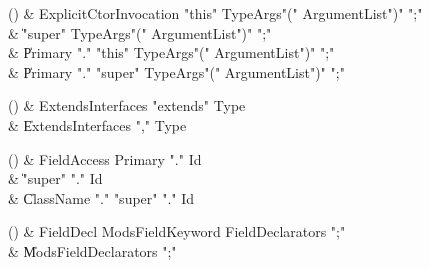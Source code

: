 \begin{bbgrammarappendix}

() & ExplicitCtorInvocation \label{prod:ExplicitCtorInvocation}  \: \xcd"this" TypeArgs\opt \xcd"(" ArgumentList\opt \xcd")" \xcd";"  \\

 &    \| \xcd"super" TypeArgs\opt \xcd"(" ArgumentList\opt \xcd")" \xcd";" \\
 &    \| Primary \xcd"." \xcd"this" TypeArgs\opt \xcd"(" ArgumentList\opt \xcd")" \xcd";" \\
 &    \| Primary \xcd"." \xcd"super" TypeArgs\opt \xcd"(" ArgumentList\opt \xcd")" \xcd";" \\

\end{bbgrammarappendix}

\begin{bbgrammarappendix}

() & ExtendsInterfaces \label{prod:ExtendsInterfaces}  \: \xcd"extends" Type  \\

 &    \| ExtendsInterfaces \xcd"," Type \\

\end{bbgrammarappendix}

\begin{bbgrammarappendix}

() & FieldAccess \label{prod:FieldAccess}  \: Primary \xcd"." Id  \\

 &    \| \xcd"super" \xcd"." Id \\
 &    \| ClassName \xcd"." \xcd"super"  \xcd"." Id \\

\end{bbgrammarappendix}

\begin{bbgrammarappendix}

() & FieldDecl \label{prod:FieldDecl}  \: Mods\opt FieldKeyword FieldDeclarators \xcd";"  \\

 &    \| Mods\opt FieldDeclarators \xcd";" \\

\end{bbgrammarappendix}

